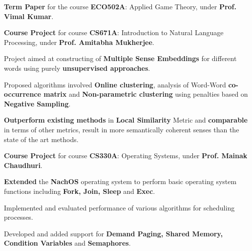 \documentclass[a4paper]{norm-resume}
\begin{document}
	\vspace{2mm}

	\begin{tightitemize}
	\small
	{
	\item \textbf{Term Paper} for the course \textbf{ECO502A}: Applied Game Theory, under \textbf{Prof. Vimal Kumar}.
	}
	\end{tightitemize}

	\vspace{2mm}


					\descript{Aug '15 - Nov '15}	
	\begin{tightitemize}
	\small
	{
	\item \textbf{Course Project} for course \textbf{CS671A}: Introduction to Natural Language Processing, under \textbf{Prof. Amitabha Mukherjee}.
	\item Project aimed at constructing of \textbf{Multiple Sense Embeddings} for different words using purely \textbf{unsupervised approaches}.
	\item Proposed algorithms involved \textbf{Online clustering}, analysis of Word-Word \textbf{co-occurrence matrix} and \textbf{Non-parametric clustering} using penalties based on \textbf{Negative Sampling}.
	\item \textbf{Outperform existing methods} in \textbf{Local Similarity} Metric and \textbf{comparable} in terms of other metrics, result in more semantically coherent senses than the state of the art methods.
	}
	\end{tightitemize}
		
	\vspace{2mm}

	   \descript{July '15 - Nov '15}
	\begin{tightitemize}
	\small
	{
	\item \textbf{Course Project} for course \textbf{CS330A}: Operating Systems, under \textbf{Prof. Mainak Chaudhuri}.
	\item \textbf{Extended} the \textbf{NachOS} operating system to perform basic operating system functions including \textbf{Fork, Join, Sleep} and \textbf{Exec}. 
	\item Implemented and evaluated performance of various algorithms for scheduling processes.
	\item Developed and added support for \textbf{Demand Paging, Shared Memory, Condition Variables} and \textbf{Semaphores}.	
	}
	\end{tightitemize}
		
\end{document}
